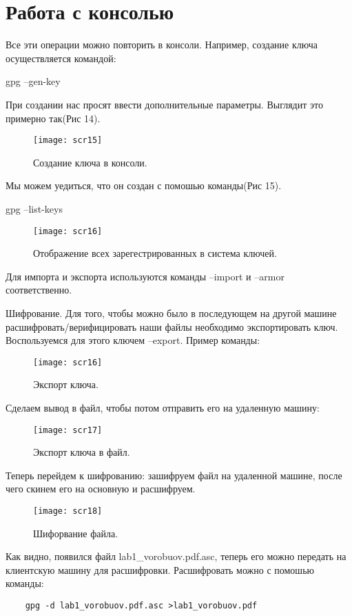 \documentclass[a4paper,12pt]{article}
\begin{document}
\section[8]{Работа с консолью}
Все эти операции можно повторить в консоли. Например, создание ключа осуществляется командой:
\begin{verbatim*}
	gpg --gen-key
\end{verbatim*}
При создании нас просят ввести дополнительные параметры. Выглядит это примерно так(Рис 14).
\begin{figure}
	\center
	\texttt{[image: scr15]}
	\caption{Создание ключа в консоли.}
\end{figure}
Мы можем уедиться, что он создан с помошью команды(Рис 15).
\begin{verbatim*}
	gpg --list-keys
\end{verbatim*}

\begin{figure}
	\center
	\texttt{[image: scr16]}
	\caption{Отображение всех зарегестрированных в система ключей.}
\end{figure}

Для импорта и экспорта используются команды --import и --armor соответственно.

Шифрование. Для того, чтобы можно было в последующем на другой машине расшифровать/верифицировать наши файлы необходимо экспортировать ключ. Воспользуемся для этого ключем --export. Пример команды:

\begin{figure}[h!]
	\centering
	\texttt{[image: scr16]}
	\caption{Экспорт ключа.}
\end{figure}

Сделаем вывод в файл, чтобы потом отправить его на удаленную машину:

\begin{figure}[h!]
	\centering
	\texttt{[image: scr17]}
	\caption{Экспорт ключа в файл.}
\end{figure}

Теперь перейдем к шифрованию: зашифруем файл на удаленной машине, после чего скинем его на основную и расшифруем.
 
\begin{figure}[h!]
	\centering
	\texttt{[image: scr18]}
	\caption{Шифорвание файла.}
\end{figure}

Как видно, появился файл lab1\_vorobuov.pdf.asc, теперь его можно передать на клиентскую машину для расшифровки. Расшифровать можно с помошью команды:
\begin{verbatim}
	gpg -d lab1_vorobuov.pdf.asc >lab1_vorobuov.pdf
\end{verbatim}
\end{document}
